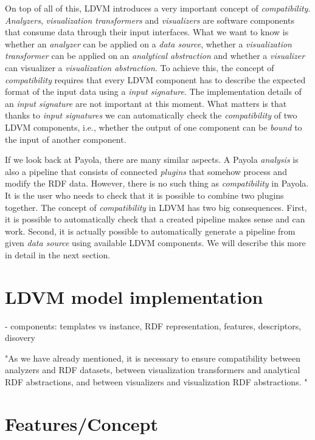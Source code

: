 On top of all of this, LDVM introduces a very important concept of \emph{compatibility}. \emph{Analyzers}, \emph{visualization transformers} and \emph{visualizers} are software components that consume data through their input interfaces. What we want to know is whether an \emph{analyzer} can be applied on a \emph{data source}, whether a \emph{visualization transformer} can be applied on an \emph{analytical abstraction} and whether a \emph{visualizer} can visualizer a \emph{visualization abstraction}. To achieve this, the concept of \emph{compatibility} requires that every LDVM component has to describe the expected format of the input data using a \emph{input signature}. The implementation details of an \emph{input signature} are not important at this moment. What matters is that thanks to \emph{input signatures} we can automatically check the \emph{compatibility} of two LDVM components, i.e., whether the output of one component can be \emph{bound} to the input of another component.

If we look back at Payola, there are many similar aspects. A Payola \emph{analysis} is also a pipeline that consists of connected \emph{plugins} that somehow process and modify the RDF data. However, there is no such thing as \emph{compatibility} in Payola. It is the user who needs to check that it is possible to combine two plugins together. The concept of \emph{compatibility} in LDVM has two big consequences. First, it is possible to automatically check that a created pipeline makes sense and can work. Second, it is actually possible to automatically generate a pipeline from given \emph{data source} using available LDVM components. We will describe this more in detail in the next section.

\section{LDVM model implementation}

- components: templates vs instance, RDF representation, features, descriptors, disovery

"As we have
already mentioned, it is necessary to ensure compatibility
between analyzers and RDF datasets, between visualization
transformers and analytical RDF abstractions, and between
visualizers and visualization RDF abstractions. "

\section{Features/Concept}

